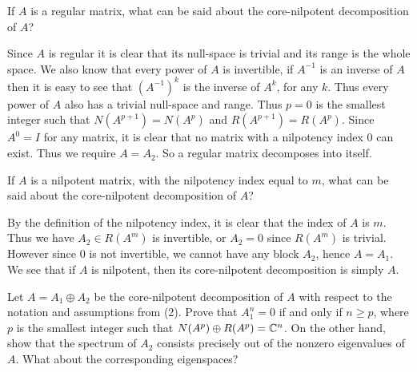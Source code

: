 \documentclass{article}
\begin{document}
\begin{problem}
  If $A$ is a regular matrix, what can be said about the core-nilpotent decomposition of $A$?
\end{problem}

\begin{solution}
  Since $A$ is regular it is clear that its null-space is trivial and its range is the whole space.
  We also know that every power of $A$ is invertible, if $A^{-1}$ is an inverse of $A$ then it is easy to see that $(A^{-1})^k$ is the inverse of $A^k$, for any $k$.
  Thus every power of $A$ also has a trivial null-space and range.
  Thus $p = 0$ is the smallest integer such that $N(A^{p + 1}) = N(A^p)$ and $R(A^{p + 1}) = R(A^p)$.
  Since $A^0 = I$ for any matrix, it is clear that no matrix with a nilpotency index $0$ can exist.
  Thus we require $A = A_2$.
  So a regular matrix decomposes into itself.
\end{solution}

\begin{problem}
  If $A$ is a nilpotent matrix, with the nilpotency index equal to $m$, what can be said about the core-nilpotent decomposition of $A$?
\end{problem}

\begin{solution}
  By the definition of the nilpotency index, it is clear that the index of $A$ is $m$.
  Thus we have $A_2 \in R(A^m)$ is invertible, or $A_2 = 0$ since $R(A^m)$ is trivial.
  However since $0$ is not invertible, we cannot have any block $A_2$, hence $A = A_1$.
  We see that if $A$ is nilpotent, then its core-nilpotent decomposition is simply $A$.
\end{solution}

\begin{problem}
  Let $A = A_1 \oplus A_2$ be the core-nilpotent decomposition of $A$ with respect to the notation and assumptions from (2).
  Prove that $A_1^n = 0$ if and only if $n \ge p$, where $p$ is the smallest integer such that $N(A^p) \oplus R(A^p) = \mathbb{C}^n$.
  On the other hand, show that the spectrum of $A_2$ consists precisely out of the nonzero eigenvalues of $A$.
  What about the corresponding eigenspaces?
\end{problem}
\end{document}
